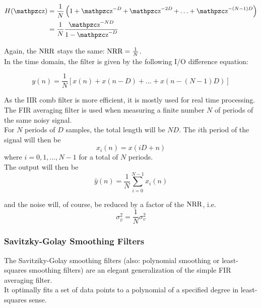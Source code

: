\begin{align*}
	H(\z)&=\frac{1}{N}\left( 1+ \z^{-D}+\z^{-2D}+\ldots + \z^{-(N-1)D} \right) \\
	&= \frac{1}{N}\frac{\z^{-ND}}{1-\z^{-D}}
\end{align*}

Again, the $\operatorname{\text{NRR}}$ stays the same: $\operatorname{\text{NRR}} = \frac{1}{N}$. \\

In the time domain, the filter is given by the following I/O difference equation:

\begin{equation*}
	y(n) = \frac{1}{N} \left[ x(n)+x(n-D)+\ldots+x(n-(N-1)D) \right]
\end{equation*}

As the IIR comb filter is more efficient, it is mostly used for real time
processing. The FIR averaging filter is used when measuring a finite number 
$N$ of periods of the same noisy signal. \\

For $N$ periods of $D$ samples, the total length will be $ND$. The $i$th period
of the signal will then be
\begin{equation*}
	x_i(n) = x(iD+n)
\end{equation*}
where $i=0,1,\ldots,N-1$ for a total of $N$ periods. \\

The output will then be
\begin{equation*}
	\hat{y}(n)=\frac{1}{N}\sum_{i=0}^{N-1}x_i(n)
\end{equation*}

and the noise will, of course, be reduced by a factor of the $\operatorname{\text{NRR}}$, i.e.
\begin{equation*}
	\sigma_{\hat{v}}^2 = \frac{1}{N} \sigma_v^2
\end{equation*}


\subsubsection{Savitzky-Golay Smoothing Filters}

The Savitziky-Golay smoothing filters (also: polynomial smoothing or 
least-squares smoothing filters) are an elegant generalization of the
simple FIR averaging filter. \\

It optimally fits a set of data points to a polynomial of a specified 
degree in least-squares sense.

